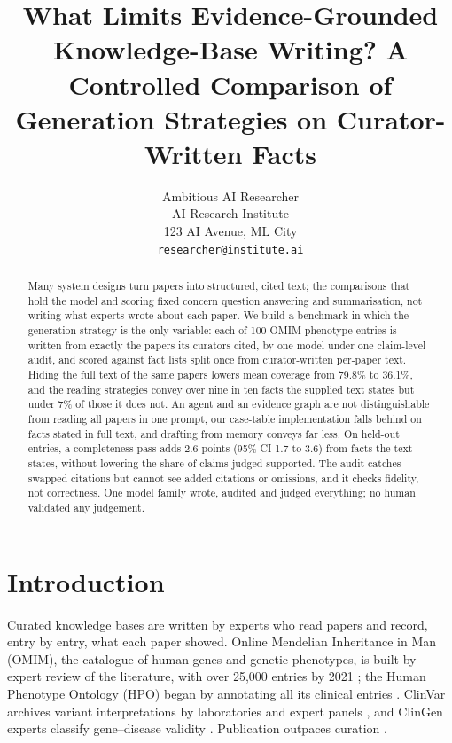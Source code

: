 \documentclass{article} %
\title{What Limits Evidence-Grounded Knowledge-Base Writing? A Controlled Comparison of Generation Strategies on Curator-Written Facts}
\author{Ambitious AI Researcher\\
AI Research Institute\\
123 AI Avenue, ML City\\
\texttt{researcher@institute.ai}
}
\begin{document}
\maketitle

\begin{abstract}
Many system designs turn papers into structured, cited text; the comparisons that hold the model and scoring fixed concern question answering and summarisation, not writing what experts wrote about each paper. We build a benchmark in which the generation strategy is the only variable: each of 100 OMIM phenotype entries is written from exactly the papers its curators cited, by one model under one claim-level audit, and scored against fact lists split once from curator-written per-paper text. Hiding the full text of the same papers lowers mean coverage from 79.8\% to 36.1\%, and the reading strategies convey over nine in ten facts the supplied text states but under 7\% of those it does not. An agent and an evidence graph are not distinguishable from reading all papers in one prompt, our case-table implementation falls behind on facts stated in full text, and drafting from memory conveys far less. On held-out entries, a completeness pass adds 2.6 points (95\% CI 1.7 to 3.6) from facts the text states, without lowering the share of claims judged supported. The audit catches swapped citations but cannot see added citations or omissions, and it checks fidelity, not correctness. One model family wrote, audited and judged everything; no human validated any judgement.
\end{abstract}

\section{Introduction}
\label{sec:intro}
Curated knowledge bases are written by experts who read papers and record, entry by entry, what each paper showed. Online Mendelian Inheritance in Man (OMIM), the catalogue of human genes and genetic phenotypes, is built by expert review of the literature, with over 25,000 entries by 2021 \citep{Amberger2014OmimorgOnline,amberger2019omim,hamosh2021online}; the Human Phenotype Ontology (HPO) began by annotating all its clinical entries \citep{robinson2008human}. ClinVar archives variant interpretations by laboratories and expert panels \citep{Landrum2017ClinvarImproving,landrum2025clinvar}, and ClinGen experts classify gene--disease validity \citep{strande2017evaluating}. Publication outpaces curation \citep{caufield2024curategpt,Green2023LitsummLarge}.
\end{document}
